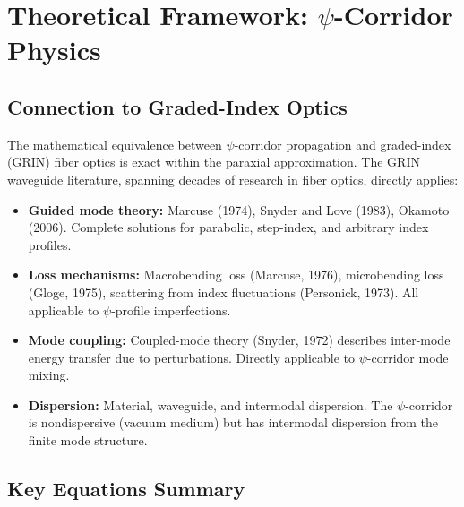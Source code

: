 \documentclass[11pt,a4paper]{article}
\begin{document}
\section{Theoretical Framework: $\psi$-Corridor Physics}

\subsection{Connection to Graded-Index Optics}

The mathematical equivalence between $\psi$-corridor propagation
and graded-index (GRIN) fiber optics is exact within the paraxial
approximation. The GRIN waveguide literature, spanning decades of
research in fiber optics, directly applies:

\begin{itemize}
\item \textbf{Guided mode theory:} Marcuse (1974), Snyder and Love (1983),
Okamoto (2006). Complete solutions for parabolic, step-index, and
arbitrary index profiles.

\item \textbf{Loss mechanisms:} Macrobending loss (Marcuse, 1976),
microbending loss (Gloge, 1975), scattering from index fluctuations
(Personick, 1973). All applicable to $\psi$-profile imperfections.

\item \textbf{Mode coupling:} Coupled-mode theory (Snyder, 1972)
describes inter-mode energy transfer due to perturbations. Directly
applicable to $\psi$-corridor mode mixing.

\item \textbf{Dispersion:} Material, waveguide, and intermodal
dispersion. The $\psi$-corridor is nondispersive (vacuum medium)
but has intermodal dispersion from the finite mode structure.
\end{itemize}

\subsection{Key Equations Summary}
\end{document}
